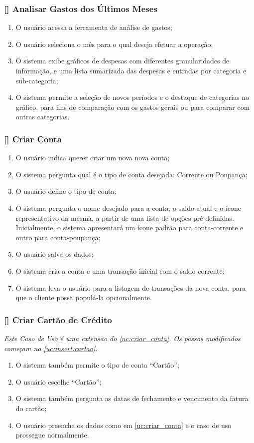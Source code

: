 \documentclass[a4paper]{abnt}
\begin{document}
\subsubsection{[\UC] Analisar Gastos dos Últimos Meses}
\begin{enumerate}[itemsep=-1ex]
	\item O usuário acessa a ferramenta de análise de gastos;
	\item O usuário seleciona o mês para o qual deseja efetuar a operação;
	\item O sistema exibe gráficos de despesas com diferentes granularidades de informação, e uma lista sumarizada das despesas e entradas por categoria e sub-categoria;
	\item O sistema permite a seleção de novos períodos e o destaque de categorias no gráfico, para fins de comparação com os gastos gerais ou para comparar com outras categorias.
\end{enumerate}

\subsubsection{[\UC\label{uc:criar_conta}] Criar Conta}
\begin{enumerate}[itemsep=-1ex]
	\item O usuário indica querer criar um nova nova conta;
	\item O sistema pergunta qual é o tipo de conta desejada: Corrente ou Poupança; \label{uc:insert:cartao}
	\item O usuário define o tipo de conta;
	\item O sistema pergunta o nome desejado para a conta, o saldo atual e o ícone representativo da mesma, a partir de uma lista de opções pré-definidas. Inicialmente, o sistema apresentará um ícone padrão para conta-corrente e outro para conta-poupança;
	\item O usuário salva os dados;
	\item O sistema cria a conta e uma transação inicial com o saldo corrente;
	\item O sistema leva o usuário para a listagem de transações da nova conta, para que o cliente possa populá-la opcionalmente.
\end{enumerate}

\subsubsection{[\UC] Criar Cart\~ao de Crédito}
\emph{Este Caso de Uso é uma extensão do \ref{uc:criar_conta}. Os passos modificados começam no \ref{uc:insert:cartao}.}
\begin{enumerate}[itemsep=-1ex,topsep=-1ex]
	\item O sistema também permite o tipo de conta ``Cart\~ao'';
	\item O usuário escolhe ``Cart\~ao'';
	\item O sistema também pergunta as datas de fechamento e vencimento da fatura do cart\~ao;
	\item O usuário preenche os dados como em \ref{uc:criar_conta} e o caso de uso prossegue normalmente.
\end{enumerate}
\end{document}
